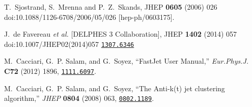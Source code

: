 \documentclass[12pt,A4paper
english, %
singlespacing, %
parskip, %
headsepline, %
]{article}
\begin{document}
\begin{thebibliography}{9}
  T.~Sjostrand, S.~Mrenna and P.~Z.~Skands,
  JHEP {\bf 0605} (2006) 026
  doi:10.1088/1126-6708/2006/05/026
  [hep-ph/0603175].
  
  
  J.~de Favereau {\it et al.} [DELPHES 3 Collaboration],
  JHEP {\bf 1402} (2014) 057
  doi:10.1007/JHEP02(2014)057
\href{http://www.arXiv.org/abs/arXiv:1307.6346}{{\tt 1307.6346}}
  
  
M.~Cacciari, G.~P. Salam, and G.~Soyez, ``{FastJet User Manual},'' {\em
  Eur.Phys.J.} {\bf C72} (2012) 1896,
\href{http://www.arXiv.org/abs/1111.6097}{{\tt 1111.6097}}.

M.~Cacciari, G.~P. Salam, and G.~Soyez, ``{The Anti-k(t) jet clustering
  algorithm},'' {\em JHEP} {\bf 0804} (2008) 063,
\href{http://www.arXiv.org/abs/0802.1189}{{\tt 0802.1189}}.





\end{thebibliography}
\end{document}
